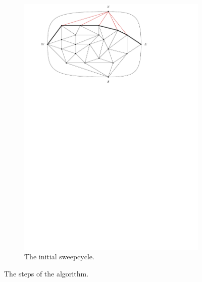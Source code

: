 \begin{figure}
    \begin{subfigure}[b]{.9 \textwidth}
      \includegraphics[width=\textwidth]{examples/img/smallExample/smallExample-2}
      \caption{The initial sweepcycle.}
      \label{fig:ex:simple:2}
    \end{subfigure}
    \label{fig:ex:vert}
    \caption{The steps of the algorithm.}
\end{figure}

